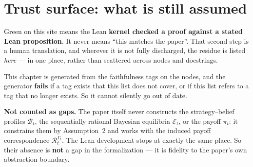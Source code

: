 
\chapter{Trust surface: what is still assumed}

Green on this site means the Lean \textbf{kernel checked a proof against a stated Lean proposition}.
It never means ``this matches the paper''. That second step is a human translation, and wherever it
is not fully discharged, the residue is listed \emph{here} --- in one place, rather than scattered
across nodes and docstrings.

This chapter is generated from the faithfulness tags on the nodes, and the generator \textbf{fails}
if a tag exists that this list does not cover, or if this list refers to a tag that no longer exists.
So it cannot silently go out of date.

\medskip
\noindent\textbf{Not counted as gaps.} The paper itself never constructs the strategy--belief profiles $\mathcal B_t$, the
sequentially rational Bayesian equilibria $\mathcal E_t$, or the payoff $\pi_t$: it constrains them by
Assumption~2 and works with the induced payoff correspondence $\mathcal R_t^{\Gamma_t}$. The Lean
development stops at exactly the same place. So their absence is \textbf{not} a gap in the
formalization --- it is fidelity to the paper's own abstraction boundary.

